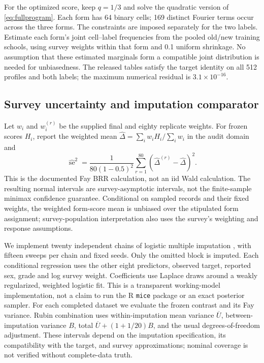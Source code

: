 For the optimized score, keep $q=1/3$ and solve the quadratic version of
\eqref{eq:fullprogram}. Each form has 64 binary cells; 169 distinct Fourier
terms occur across the three forms. The constraints are imposed separately
for the two labels. Estimate each form's joint cell--label frequencies
from the pooled old/new training schools, using survey weights within
that form and 0.1 uniform shrinkage. No assumption that these estimated
marginals form a compatible joint distribution is needed for unbiasedness.
The released tables satisfy the target identity on all 512 profiles and
both labels; the maximum numerical residual is $3.1\times10^{-16}$.

\subsection{Survey uncertainty and imputation comparator}
Let $w_i$ and $w_i^{(r)}$ be the supplied final and eighty replicate
weights. For frozen scores $H_i$, report the weighted mean
$\widehat\Delta=\sum_iw_iH_i/\sum_iw_i$ in the audit domain and
\[
 \widehat{\operatorname{se}}^2
 =\frac{1}{80(1-0.5)^2}
       \sum_{r=1}^{80}(\widehat\Delta^{(r)}-\widehat\Delta)^2.
\]
This is the documented Fay BRR calculation, not an iid Wald calculation.
The resulting normal intervals are survey-asymptotic intervals, not the
finite-sample minimax confidence guarantee. Conditional on sampled records
and their fixed weights, the weighted form-score mean is unbiased over
the stipulated form assignment; survey-population interpretation also
uses the survey's weighting and response assumptions.

We implement twenty independent chains of logistic multiple imputation
\citep{vanbuuren2011}, with fifteen sweeps per chain and fixed seeds. Only
the omitted block is imputed. Each conditional regression uses the other
eight predictors, observed target, reported sex, grade and log survey
weight. Coefficients use Laplace draws around a weakly regularized,
weighted logistic fit. This is a transparent working-model implementation,
not a claim to run the R \texttt{mice} package or an exact posterior sampler.
For each completed dataset we evaluate the frozen contrast and its Fay
variance. Rubin combination uses within-imputation mean variance
$\overline U$, between-imputation variance $B$, total
$\overline U+(1+1/20)B$, and the usual degrees-of-freedom adjustment.
These intervals depend on the imputation specification, its compatibility
with the target, and survey approximations; nominal coverage is not
verified without complete-data truth.

